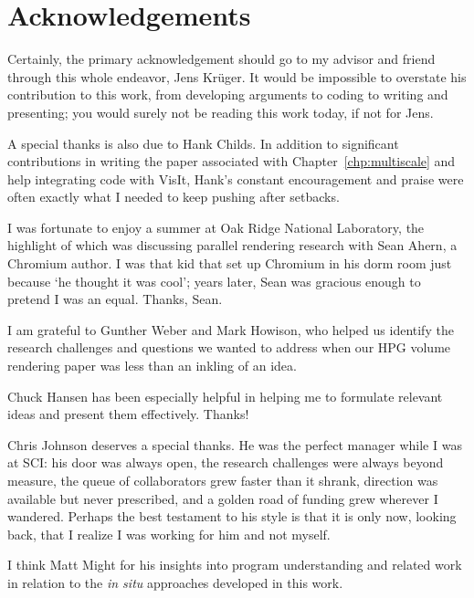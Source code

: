 \section*{Acknowledgements}

Certainly, the primary acknowledgement should go to my advisor and
friend through this whole endeavor, Jens Kr\"uger.  It would be
impossible to overstate his contribution to this work, from developing
arguments to coding to writing and presenting; you would surely not be
reading this work today, if not for Jens.

A special thanks is also due to Hank Childs.  In addition to
significant contributions in writing the paper associated with
Chapter~\ref{chp:multiscale} and help integrating code with VisIt,
Hank's constant encouragement and praise were often exactly what I
needed to keep pushing after setbacks.

I was fortunate to enjoy a summer at Oak Ridge National Laboratory, the
highlight of which was discussing parallel rendering research with Sean
Ahern, a Chromium author.  I was that kid that set up Chromium in his
dorm room just because `he thought it was cool'; years later, Sean was
gracious enough to pretend I was an equal.  Thanks, Sean.

I am grateful to Gunther Weber and Mark Howison, who helped us identify
the research challenges and questions we wanted to address when our HPG
volume rendering paper was less than an inkling of an idea.

Chuck Hansen has been especially helpful in helping me to formulate
relevant ideas and present them effectively.  Thanks!


Chris Johnson deserves a special thanks.  He was the perfect manager
while I was at SCI: his door was always open, the research challenges
were always beyond measure, the queue of collaborators grew faster than
it shrank, direction was available but never prescribed, and a golden
road of funding grew wherever I wandered.  Perhaps the best testament
to his style is that it is only now, looking back, that I realize I was
working for him and not myself.

I think Matt Might for his insights into program understanding and
related work in relation to the \textit{in situ} approaches developed
in this work.

